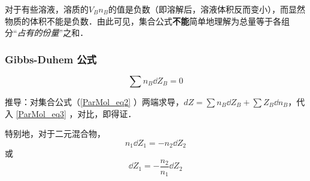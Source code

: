对于有些溶液，溶质的${V_B}n_B$的值是负数（即溶解后，溶液体积反而变小），而显然物质的体积不能是负数．由此可见，集合公式\textbf{不能}简单地理解为总量等于各组分“\textsl{占有的份量}”之和．

\subsubsection{Gibbs-Duhem 公式}
\begin{equation}
\sum n_B \dd Z_B = 0
\end{equation}

推导：对集合公式（\autoref{ParMol_eq2} ）两端求导，$dZ=\sum n_B \dd Z_B + \sum {Z_B}  \dd n_B$，代入 \autoref{ParMol_eq3} ，对比，即得证．

特别地，对于二元混合物，
\begin{equation}
n_1 \dd {Z_1} = - n_2 \dd {Z_2}
\end{equation}
或
\begin{equation}
\dd {Z_1} = -\frac{n_2}{n_1} \dd {Z_2}
\end{equation}

